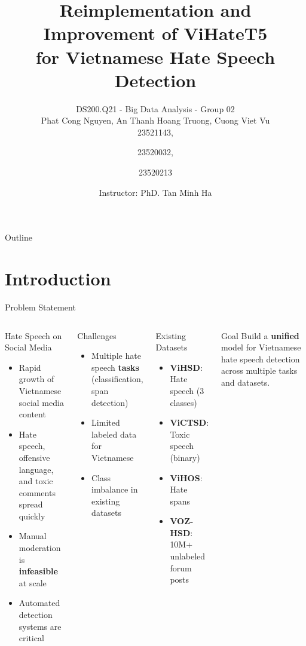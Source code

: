 \documentclass[10pt, aspectratio=169]{beamer}
\title[ViHateT5]{\textbf{Reimplementation and Improvement of ViHateT5 \\ for Vietnamese Hate Speech Detection}}
\author[DS200.Q21]{DS200.Q21 - Big Data Analysis - Group 02 \\  Phat Cong Nguyen, An Thanh Hoang Truong, Cuong Viet Vu \\ 23521143, \and 23520032, \and 23520213}
\institute[UIT]{University of Information Technology -- VNU-HCM}
\date[\today]{Instructor: PhD. Tan Minh Ha}
\begin{document}
\begin{frame}[plain]
  \titlepage
\end{frame}

\begin{frame}{Outline}
  \tableofcontents
\end{frame}

\section{Introduction}

\begin{frame}[shrink=5]{Problem Statement}
  \begin{columns}[T]
    \begin{block}{Hate Speech on Social Media}
      \begin{itemize}
        \item Rapid growth of Vietnamese social media content
        \item Hate speech, offensive language, and toxic comments spread quickly
        \item Manual moderation is \textbf{infeasible} at scale
        \item Automated detection systems are critical
      \end{itemize}
    \end{block}
    \vspace{0.3cm}
    \begin{alertblock}{Challenges}
      \begin{itemize}
        \item Multiple hate speech \textbf{tasks} (classification, span detection)
        \item Limited labeled data for Vietnamese
        \item Class imbalance in existing datasets
      \end{itemize}
    \end{alertblock}

    \begin{exampleblock}{Existing Datasets}
      \begin{itemize}
        \item \textbf{ViHSD}: Hate speech (3 classes)
        \item \textbf{ViCTSD}: Toxic speech (binary)
        \item \textbf{ViHOS}: Hate spans
        \item \textbf{VOZ-HSD}: 10M+ unlabeled forum posts
      \end{itemize}
    \end{exampleblock}
    \vspace{0.3cm}
    \begin{block}{Goal}
      Build a \textbf{unified} model for Vietnamese hate speech detection across multiple tasks and datasets.
    \end{block}
  \end{columns}
\end{frame}
\end{document}
